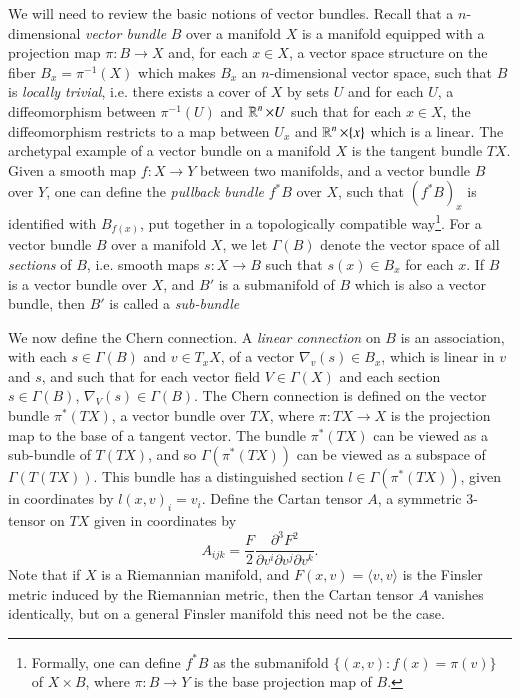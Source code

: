 We will need to review the basic notions of vector bundles. Recall that a $n$-dimensional \emph{vector bundle} $B$ over a manifold $X$ is a manifold equipped with a projection map $\pi: B \to X$ and, for each $x \in X$, a vector space structure on the fiber $B_x = \pi^{-1}(X)$ which makes $B_x$ an $n$-dimensional vector space, such that $B$ is \emph{locally trivial}, i.e. there exists a cover of $X$ by sets $U$ and for each $U$, a diffeomorphism between $\pi^{-1}(U)$ and $\operatorname{\mathbb{R}}^n \times U$ such that for each $x \in X$, the diffeomorphism restricts to a map between $U_x$ and $\operatorname{\mathbb{R}}^n \times \{ x \}$ which is a linear. The archetypal example of a vector bundle on a manifold $X$ is the tangent bundle $TX$. Given a smooth map $f: X \to Y$ between two manifolds, and a vector bundle $B$ over $Y$, one can define the \emph{pullback bundle} $f^* B$ over $X$, such that $(f^* B)_x$ is identified with $B_{f(x)}$, put together in a topologically compatible way\footnote{Formally, one can define $f^* B$ as the submanifold $\{ (x,v): f(x) = \pi(v) \}$ of $X \times B$, where $\pi: B \to Y$ is the base projection map of $B$.}. For a vector bundle $B$ over a manifold $X$, we let $\Gamma(B)$ denote the vector space of all \emph{sections} of $B$, i.e. smooth maps $s: X \to B$ such that $s(x) \in B_x$ for each $x$. If $B$ is a vector bundle over $X$, and $B'$ is a submanifold of $B$ which is also a vector bundle, then $B'$ is called a \emph{sub-bundle} 

We now define the Chern connection.  A \emph{linear connection} on $B$ is an association, with each $s \in \Gamma(B)$ and $v \in T_x X$, of a vector $\nabla_v(s) \in B_x$, which is linear in $v$ and $s$, and such that for each vector field $V \in \Gamma(X)$ and each section $s \in \Gamma(B)$, $\nabla_V(s) \in \Gamma(B)$. The Chern connection is defined on the vector bundle $\pi^*(TX)$, a vector bundle over $TX$, where $\pi: TX \to X$ is the projection map to the base of a tangent vector. The bundle $\pi^*(TX)$ can be viewed as a sub-bundle of $T(TX)$, and so $\Gamma(\pi^*(TX))$ can be viewed as a subspace of $\Gamma(T(TX))$. This bundle has a distinguished section $l \in \Gamma(\pi^*(TX))$, given in coordinates by $l(x,v)_i = v_i$. Define the Cartan tensor $A$, a symmetric 3-tensor on $TX$ given in coordinates by
%
\begin{equation}
  A_{ijk} = \frac{F}{2} \frac{\partial^3 F^2}{\partial v^i \partial v^j \partial v^k}. 
\end{equation}
%
Note that if $X$ is a Riemannian manifold, and $F(x,v) = \langle v,v \rangle$ is the Finsler metric induced by the Riemannian metric, then the Cartan tensor $A$ vanishes identically, but on a general Finsler manifold this need not be the case.

